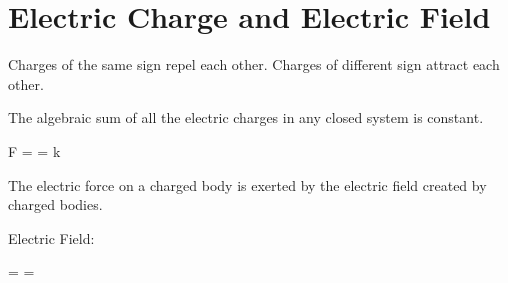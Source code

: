 \chapter{Electric Charge and Electric Field}


    \par Charges of the same sign repel each other. Charges of different sign
      attract each other.


    \par The algebraic sum of all the electric charges in any closed system
      is constant.



  \begin{eqbox}
    F =  \cdot {}
      = k 
  \end{eqbox}


  \par The electric force on a charged body is exerted by the electric field
    created by  charged bodies.
  \par Electric Field:
  \begin{eqbox}
     = 
      =   
  \end{eqbox}
